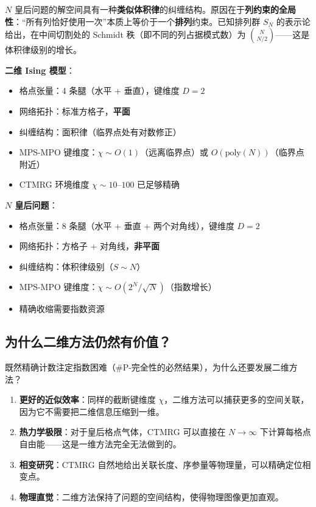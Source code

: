 \documentclass[12pt,a4paper]{ctexart}
\begin{document}
$N$ 皇后问题的解空间具有一种\textbf{类似体积律}的纠缠结构。原因在于\textbf{列约束的全局性}：``所有列恰好使用一次''本质上等价于一个\textbf{排列}约束。已知排列群 $S_N$ 的表示论给出，在中间切割处的 Schmidt 秩（即不同的列占据模式数）为 $\binom{N}{N/2}$——这是体积律级别的增长。

\begin{tcolorbox}[title=与 Ising 模型的对比, colback=blue!5, colframe=tensorblue]
\textbf{二维 Ising 模型}：
\begin{itemize}
\item 格点张量：4 条腿（水平 + 垂直），键维度 $D = 2$
\item 网络拓扑：标准方格子，\textbf{平面}
\item 纠缠结构：面积律（临界点处有对数修正）
\item MPS-MPO 键维度：$\chi \sim O(1)$（远离临界点）或 $O(\text{poly}(N))$（临界点附近）
\item CTMRG 环境维度 $\chi \sim 10\text{--}100$ 已足够精确
\end{itemize}

\textbf{$N$ 皇后问题}：
\begin{itemize}
\item 格点张量：8 条腿（水平 + 垂直 + 两个对角线），键维度 $D = 2$
\item 网络拓扑：方格子 + 对角线，\textbf{非平面}
\item 纠缠结构：体积律级别（$S \sim N$）
\item MPS-MPO 键维度：$\chi \sim O(2^N/\sqrt{N})$（指数增长）
\item 精确收缩需要指数资源
\end{itemize}
\end{tcolorbox}

\subsection{为什么二维方法仍然有价值？}

既然精确计数注定指数困难（\#P-完全性的必然结果），为什么还要发展二维方法？

\begin{enumerate}
\item \textbf{更好的近似效率}：同样的截断键维度 $\chi$，二维方法可以捕获更多的空间关联，因为它不需要把二维信息压缩到一维。
\item \textbf{热力学极限}：对于皇后格点气体，CTMRG 可以直接在 $N \to \infty$ 下计算每格点自由能——这是一维方法完全无法做到的。
\item \textbf{相变研究}：CTMRG 自然地给出关联长度、序参量等物理量，可以精确定位相变点。
\item \textbf{物理直觉}：二维方法保持了问题的空间结构，使得物理图像更加直观。
\end{enumerate}
\end{document}
